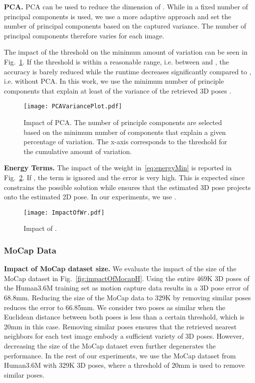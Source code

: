 \documentclass[10pt,journal,compsoc]{IEEEtran}
\makeatletter
\newcommand*{\ie}{i.e.\@\xspace}
\makeatother
\begin{document}
\noindent\textbf{PCA.} PCA can be used to reduce the dimension of . While
in \cite{Yasin_2016_CVPR} a fixed number of principal components is used, we use a more adaptive approach and set the number of principal components based on the captured variance. The number of principal components therefore varies for each image.   

The impact of the threshold on the minimum amount of variation can be seen in Fig.~\ref{fig:PCAVariancePlot}. If the threshold is within a reasonable range, \ie between  and , the accuracy is barely reduced while the runtime decreases significantly compared to , \ie without PCA. In this work, we use the minimum number of principle components that explain at least  of the variance of the retrieved 3D poses .\\
\begin{figure}[t]
\begin{center}
\texttt{[image: PCAVariancePlot.pdf]}
\end{center}
   \caption{Impact of PCA. The number of principle components are selected based on the minimum number of components that explain a given percentage of variation. The x-axis corresponds to the threshold for the cumulative amount of variation.}
\label{fig:PCAVariancePlot}
\end{figure}

\noindent\textbf{Energy Terms.} The impact of the weight  in~\eqref{eq:energyMin} is reported
in Fig.~\ref{fig:ImpactOfAlpha}. If , the term  is ignored and the error is very high. This is expected
since  constrains the possible solution while  ensures that the estimated 3D pose projects onto the estimated 2D pose.  
In our experiments, we use . \\
\begin{figure}[t]
\begin{center}
\texttt{[image: ImpactOfWr.pdf]}
\end{center}
   \caption{Impact of .}
\label{fig:ImpactOfAlpha}
\end{figure}

\subsubsection*{MoCap Data}\label{sec:mocap_data}

\textbf{Impact of MoCap dataset size.}
We evaluate the impact of the size of the MoCap dataset in Fig.~\ref{fig:impactOfMocapH}. Using the entire 469K 3D poses of the 
Human3.6M training set as motion capture data results in a 3D pose error of 68.8mm. Reducing the size of the MoCap data to 329K by
removing similar poses reduces the error to 66.85mm. We consider two poses as similar when the Euclidean distance between 
both poses is less than a certain threshold, which is 20mm in this case. Removing similar poses ensures that the retrieved nearest neighbors for each
test image embody a sufficient variety of 3D poses. However, decreasing the size of the MoCap dataset even further 
degenerates the performance. In the rest of our experiments, we use the MoCap dataset from Human3.6M with 329K 3D poses, 
where a threshold of 20mm is used to remove similar poses.\\
\end{document}
